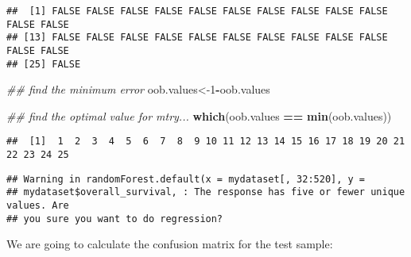 \documentclass[
]{article}
\newenvironment{Shaded}{\begin{snugshade}}{\end{snugshade}}
\newcommand{\CommentTok}[1]{\textcolor[rgb]{0.56,0.35,0.01}{\textit{#1}}}
\newcommand{\DataTypeTok}[1]{\textcolor[rgb]{0.13,0.29,0.53}{#1}}
\newcommand{\DecValTok}[1]{\textcolor[rgb]{0.00,0.00,0.81}{#1}}
\newcommand{\KeywordTok}[1]{\textcolor[rgb]{0.13,0.29,0.53}{\textbf{#1}}}
\newcommand{\NormalTok}[1]{#1}
\newcommand{\OperatorTok}[1]{\textcolor[rgb]{0.81,0.36,0.00}{\textbf{#1}}}
\newcommand{\OtherTok}[1]{\textcolor[rgb]{0.56,0.35,0.01}{#1}}
\newcommand{\StringTok}[1]{\textcolor[rgb]{0.31,0.60,0.02}{#1}}
\begin{document}
\begin{verbatim}
##  [1] FALSE FALSE FALSE FALSE FALSE FALSE FALSE FALSE FALSE FALSE FALSE FALSE
## [13] FALSE FALSE FALSE FALSE FALSE FALSE FALSE FALSE FALSE FALSE FALSE FALSE
## [25] FALSE
\end{verbatim}

\begin{Shaded}
\begin{Highlighting}[]
\CommentTok{## find the minimum error}
\NormalTok{oob.values<-}\DecValTok{1}\OperatorTok{-}\NormalTok{oob.values}

\CommentTok{## find the optimal value for mtry...}
\KeywordTok{which}\NormalTok{(oob.values }\OperatorTok{==}\StringTok{ }\KeywordTok{min}\NormalTok{(oob.values))}
\end{Highlighting}
\end{Shaded}

\begin{verbatim}
##  [1]  1  2  3  4  5  6  7  8  9 10 11 12 13 14 15 16 17 18 19 20 21 22 23 24 25
\end{verbatim}

\begin{Shaded}
\end{Shaded}

\begin{verbatim}
## Warning in randomForest.default(x = mydataset[, 32:520], y =
## mydataset$overall_survival, : The response has five or fewer unique values. Are
## you sure you want to do regression?
\end{verbatim}

We are going to calculate the confusion matrix for the test sample:
\end{document}

